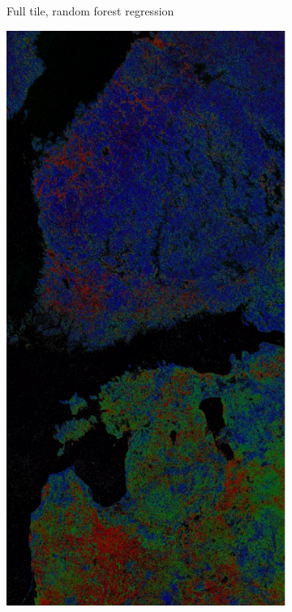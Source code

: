 \documentclass[a4paper,12pt]{scrbook}
\begin{document}
\begin{figure}
\begin{subfigure}[t]{.23\textwidth}
    \caption{Full tile, random forest regression}
    \label{subfig-fulltile-rf}
  \end{subfigure} \hfill
  \begin{subfigure}[t]{.23\textwidth}
    \includegraphics[width=\textwidth]{thesis-figures/figures-qgis/fulltile-nn}

\end{subfigure}
\end{figure}
\end{document}
